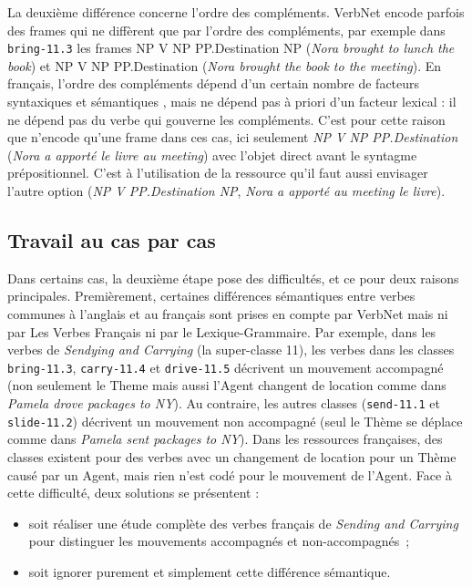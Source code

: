 La deuxième différence concerne l'ordre des compléments. VerbNet encode parfois
des frames qui ne diffèrent que par l'ordre des compléments, par exemple dans
{\color{blue}\texttt{bring-11.3}} les frames NP V NP PP.Destination NP
(\textit{Nora brought to lunch the book}) et NP V NP PP.Destination
(\textit{Nora brought the book to the meeting}). En français, l'ordre des
compléments dépend d'un certain nombre de facteurs syntaxiques et sémantiques
\citep{thuilier2012contraintes}, mais ne dépend pas à priori d'un facteur
lexical : il ne dépend pas du verbe qui gouverne les compléments. C'est pour
cette raison que \verbenet{} n'encode qu'une frame dans ces cas, ici seulement
\textit{NP V NP PP.Destination} (\textit{Nora a apporté le livre au meeting})
avec l'objet direct avant le syntagme prépositionnel. C'est à l'utilisation de
la ressource qu'il faut aussi envisager l'autre option (\textit{NP V
PP.Destination NP}, \textit{Nora a apporté au meeting le livre}).

\subsection{Travail au cas par cas}\label{casebycase}

Dans certains cas, la deuxième étape pose des difficultés, et ce pour deux
raisons principales. Premièrement, certaines différences sémantiques entre
verbes communes à l'anglais et au français sont prises en compte par VerbNet
mais ni par Les Verbes Français ni par le Lexique-Grammaire. Par exemple, dans
les verbes de \textit{Sendying and Carrying} (la super-classe 11), les verbes
dans les classes {\color{blue}\texttt{bring-11.3}},
{\color{blue}\texttt{carry-11.4}} et {\color{blue}\texttt{drive-11.5}}
décrivent un mouvement accompagné (non seulement le Theme mais aussi l'Agent
changent de location comme dans \textit{Pamela drove packages to NY}). Au
contraire, les autres classes ({\color{blue}\texttt{send-11.1}} et
{\color{blue}\texttt{slide-11.2}}) décrivent un mouvement non accompagné (seul
le Thème se déplace comme dans \textit{Pamela sent packages to NY}). Dans les
ressources françaises, des classes existent pour des verbes avec un changement
de location pour un Thème causé par un Agent, mais rien n'est codé pour le
mouvement de l'Agent. Face à cette difficulté, deux solutions se présentent :

\begin{itemize}
    \item soit réaliser une étude complète des verbes français de \textit{Sending
        and Carrying} pour distinguer les mouvements accompagnés et
        non-accompagnés~;
    \item soit ignorer purement et simplement cette différence sémantique.
\end{itemize}

